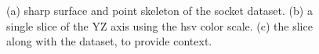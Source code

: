 \begin{figure}
    \centering
    \caption{(a) sharp surface and point skeleton of the socket dataset. (b) a single slice of the YZ axis using the hsv color scale. (c) the slice along with the dataset, to provide context.}
    \label{fig:intake}
\end{figure}
